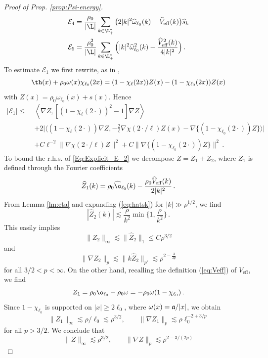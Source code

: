 \documentclass[a4paper,11pt]{article}
\numberwithin{equation}{section}
\def\be{\begin{equation}}
\def\ee{\end{equation}}
\begin{document}
\begin{proof}[Proof of Prop. \ref{prop:Psi-energy}]
\begin{align*}
\mathcal{E}_4 = \; &  \frac{\rho_{0}}{|\L|}\sum_{k\in \L^*_+} \big( 2|k|^2\widehat \omega_{\ell_0}(k) -\widehat{V}_\mathrm{eff}(k) \big) \widehat s_k \\
\mathcal{E}_5 =\; &  \frac{\rho_0^2}{|\L|}\sum_{k\in \L^*_+}\Big(  |k|^2  \widehat \omega^2_{\ell_0}(k) -  \frac{ \widehat{V}^2_\mathrm{eff}(k)}{4 |k|^2} \Big)\,.
\end{align*} To estimate $\mathcal{E}_1$ we first rewrite, as in \cite{BBCOS}, 
\begin{equation}\label{eq:E1-Z}
\th(x) + \rho_0 \omega (x) \chi_{\ell_0} (2x) = (1 -\chi_\ell (2x)) Z(x) - (1- \chi_{\ell_0} (2x)) Z(x)
\end{equation} 
with $Z(x)= \rho_0 \omega_{\ell_0} (x) +s(x)$.  Hence 
\begin{equation}  \label{Eq:Explicit_E_2} 
   \begin{split} 
       | \mathcal{E}_1| 
         \leq \; &\left\langle \nabla Z, \left[(1  -  \chi_\ell (2\cdot) )^2 -1 \right] \nabla Z \right\rangle  \\ &+ 2 \big|  \langle (1-\chi_\ell (2\cdot)) \nabla Z, -\frac{2}{\ell} \nabla \chi (2\cdot / \ell) Z(x) - \nabla \{ (1 - \chi_{\ell_0} (2\cdot)) Z \} \rangle\big|  \\ &+ C\ell^{-2}  \|  \nabla \chi (2\cdot / \ell) Z \|^2 + C \| \nabla \{ (1 - \chi_{\ell_0} (2\cdot)) Z \} \|^2 \,. \end{split}  \end{equation} 
To bound the r.h.s. of \eqref{Eq:Explicit_E_2} we decompose $Z = Z_1 + Z_2$, where $Z_1$ is defined through the Fourier coefficients
\be \label{def:Z1}
\widehat Z_1(k) =  \rho_0 \widehat{\o}_{\ell_0}(k)- \frac{\rho_0 \widehat{V}_{\rm{eff}}(k) }{2|k|^2}\,.   \ee
From Lemma \ref{lm:eta} and expanding (\ref{eq:hatsk}) for $|k| \gg \rho^{1/2}$, we find 
\[ |\widehat{Z}_2 (k)| \lesssim \frac{\rho}{k^2} \min \big\{ 1 , \frac{\rho}{k^2} \big\} \, . \]
This easily implies 
\[ \| Z_2 \|_\infty \lesssim \| \widehat{Z}_2 \|_1 \leq C \rho^{3/2} \]
and 
\[ \| \nabla Z_2 \|_p \lesssim \| k \widehat{Z}_2 \|_{p'} \lesssim \rho^{2-\frac{3}{2p}} \]
for all $3/2 < p < \infty$. On the other hand, recalling the definition (\ref{eq:Veff}) of $V_\text{eff}$, we find 
\[ Z_1 = \rho_0 \o_{\ell_0} - \rho_0 \omega = - \rho_0 \omega (1-\chi_{\ell_0}) \, . \]
Since $1- \chi_{\ell_0}$ is supported on $|x| \geq 2\ell_0$, where $\omega (x) = \frak{a}/|x|$, we obtain
\[ \| Z_1 \|_\infty \lesssim \rho / \ell_0 \lesssim \rho^{3/2} , \qquad \| \nabla Z_1 \|_p \lesssim \rho \ell_0^{-2+3/p} \]
for all $p > 3/2$. We conclude that \begin{equation}\label{eq:bds-Z} \| Z \|_\infty \lesssim \rho^{3/2}, \qquad \| \nabla Z \|_p \lesssim \rho^{2-3/(2p)} \end{equation}

\end{proof}
\end{document}

